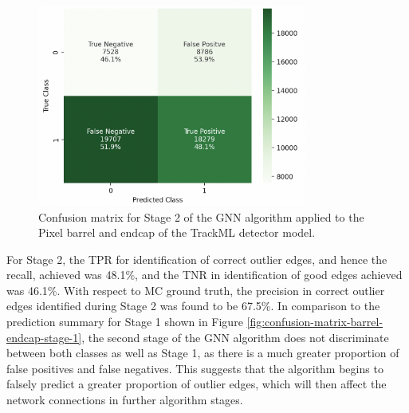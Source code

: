 \begin{figure}[htbp]
    \centering
    \includegraphics[width=0.79\textwidth]{images/7-results/confusion_matrix_barrel_stage_2.png}
    \caption{Confusion matrix for Stage 2 of the GNN algorithm applied to the Pixel barrel and endcap of the TrackML detector model.}
    \label{fig:confusion-matrix-barrel-endcap-stage-2}%
\end{figure}

For Stage 2, the TPR for identification of correct outlier edges, and hence the recall, achieved was 48.1\%, and the TNR in identification of good edges achieved was 46.1\%. With respect to MC ground truth, the precision in correct outlier edges identified during Stage 2 was found to be 67.5\%. In comparison to the prediction summary for Stage 1 shown in Figure \ref{fig:confusion-matrix-barrel-endcap-stage-1}, the second stage of the GNN algorithm does not discriminate between both classes as well as Stage 1, as there is a much greater proportion of false positives and false negatives. This suggests that the algorithm begins to falsely predict a greater proportion of outlier edges, which will then affect the network connections in further algorithm stages.








